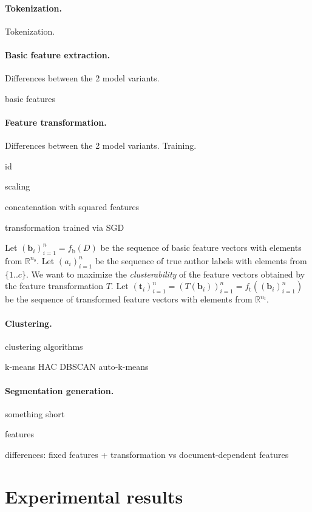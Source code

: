 \documentclass[10pt, a4paper]{article}
\begin{document}
\paragraph{Tokenization.} Tokenization.

\paragraph{Basic feature extraction.} Differences between the 2 model variants.

basic features

\paragraph{Feature transformation.} Differences between the 2 model variants. Training.

id

scaling

concatenation with squared features

transformation trained via SGD

Let $(\mathbf{b}_i)_{i=1}^n = f_\mathrm{b}(D)$ be the sequence of basic feature vectors with elements from $\mathbb{R}^{n_b}$. Let $(a_i)_{i=1}^n$ be the sequence of true author labels with elements from $\{1..c\}$. We want to maximize the \emph{clusterability} of the feature vectors obtained by the feature transformation $T$. Let $(\mathbf{t}_i)_{i=1}^n = (T(\mathbf{b}_i))_{i=1}^n = f_\mathrm{t}((\mathbf{b}_i)_{i=1}^n)$ be the sequence of transformed feature vectors with elements from $\mathbb{R}^{n_t}$.


\paragraph{Clustering.}

clustering algorithms

k-means HAC DBSCAN auto-k-means

\paragraph{Segmentation generation.} something short


features

differences: fixed features + transformation vs document-dependent features

\section{Experimental results}
\end{document}
